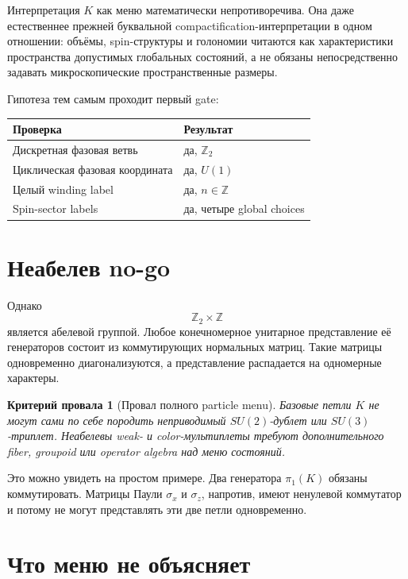 \documentclass[12pt,a4paper]{article}
\newtheorem{nogocriterion}{Критерий провала}
\begin{document}
Интерпретация \(K\) как меню математически непротиворечива. Она даже естественнее прежней буквальной compactification-интерпретации в одном отношении: объёмы, spin-структуры и голономии читаются как характеристики пространства допустимых глобальных состояний, а не обязаны непосредственно задавать микроскопические пространственные размеры.

Гипотеза тем самым проходит первый gate:
\begin{center}
\begin{tabular}{>{\raggedright\arraybackslash}p{}>{\raggedright\arraybackslash}p{}}
\toprule
Проверка & Результат \\
\midrule
Дискретная фазовая ветвь & да, \(\mathbb Z_2\) \\
Циклическая фазовая координата & да, \(U(1)\) \\
Целый winding label & да, \(n\in\mathbb Z\) \\
Spin-sector labels & да, четыре global choices \\
\bottomrule
\end{tabular}
\end{center}

\section{Неабелев no-go}

Однако
\[
\mathbb Z_2\times\mathbb Z
\]
является абелевой группой. Любое конечномерное унитарное представление её генераторов состоит из коммутирующих нормальных матриц. Такие матрицы одновременно диагонализуются, а представление распадается на одномерные характеры.

\begin{nogocriterion}[Провал полного particle menu]
Базовые петли \(K\) не могут сами по себе породить неприводимый \(SU(2)\)-дублет или \(SU(3)\)-триплет. Неабелевы weak- и color-мультиплеты требуют дополнительного fiber, groupoid или operator algebra над меню состояний.
\end{nogocriterion}

Это можно увидеть на простом примере. Два генератора \(\pi_1(K)\) обязаны коммутировать. Матрицы Паули \(\sigma_x\) и \(\sigma_z\), напротив, имеют ненулевой коммутатор и потому не могут представлять эти две петли одновременно.

\section{Что меню не объясняет}
\end{document}
